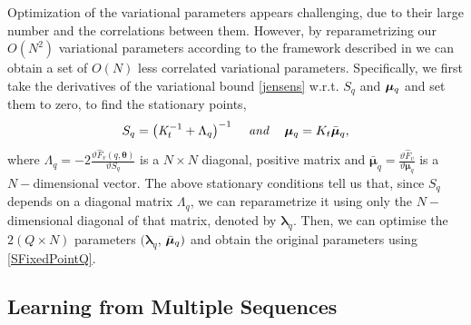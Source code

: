 \documentclass{article} %
\begin{document}
Optimization of the variational parameters appears challenging, due to
their large number and the correlations between them. However, by
reparametrizing our $O \left( N^2 \right)$ variational parameters
according to the framework described in
\cite{OpperFixedPointCovariance} we can obtain a set of $O(N)$ less
correlated variational parameters. Specifically, we first take the
derivatives of the variational bound \eqref{jensens} w.r.t. $S_q$ and
$\boldsymbol \mu_q$ and set them to zero, to find the stationary
points,
\begin{equation}
S_q = \left( \mathit{K}_t^{-1} + \Lambda_q \right)^{-1} \;\;\; \mbox{ \textit{and} } \;\;\;  \boldsymbol \mu_q = K_t \bar{\boldsymbol \mu}_q, \label{SFixedPointQ}
\end{equation}
where $\Lambda_q = - 2\frac{\vartheta \mathit{\hat{F}_v(q, \boldsymbol
    \theta)}}{\vartheta \mathit{S_q}}$ is a $N \times N$ diagonal,
positive matrix and $\bar{\boldsymbol \mu}_q = \frac{\vartheta
  \hat{F}_v}{\vartheta \boldsymbol \mu_q}$ is a $N-$dimensional
vector.
The above stationary conditions tell us that, since $S_q$ depends on a
diagonal matrix $\Lambda_q$, we can reparametrize it using only the
$N-$dimensional diagonal of that matrix, denoted by $\boldsymbol
\lambda_q$.  Then, we can optimise the $2 (Q \times N)$ parameters $(
\boldsymbol \lambda_q$, $\bar{\boldsymbol \mu}_q)$ and obtain the original
parameters using \eqref{SFixedPointQ}.



\subsection{Learning from Multiple Sequences \label{sequences}}
\end{document}
